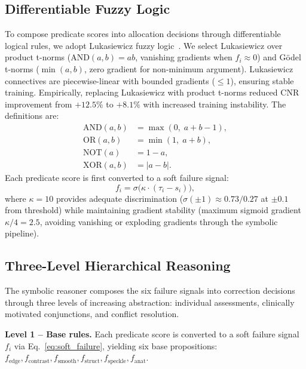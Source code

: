 \documentclass[journal,twoside,web]{ieeecolor}
\begin{document}
\subsection{Differentiable Fuzzy Logic}
\label{sec:fuzzy}
To compose predicate scores into allocation decisions through differentiable logical rules, we adopt Lukasiewicz fuzzy logic~\cite{vankrieken2022analyzing}. We select Lukasiewicz over product t-norms ($\text{AND}(a,b) = ab$, vanishing gradients when $f_i \approx 0$) and G\"{o}del t-norms ($\min(a,b)$, zero gradient for non-minimum argument). Lukasiewicz connectives are piecewise-linear with bounded gradients ($\leq 1$), ensuring stable training. Empirically, replacing Lukasiewicz with product t-norms reduced CNR improvement from $+12.5\%$ to $+8.1\%$ with increased training instability. The definitions are:
\begin{align*}
\text{AND}(a,b) &= \max(0,\; a + b - 1), \\
\text{OR}(a,b) &= \min(1,\; a + b), \\
\text{NOT}(a) &= 1 - a, \\
\text{XOR}(a,b) &= |a - b|.
\end{align*}
Each predicate score is first converted to a soft failure signal:
\begin{equation}
f_i = \sigma\!\big(\kappa \cdot (\tau_i - s_i)\big),
\label{eq:soft_failure}
\end{equation}
where $\kappa = 10$ provides adequate discrimination ($\sigma(\pm 1) \approx 0.73/0.27$ at $\pm 0.1$ from threshold) while maintaining gradient stability (maximum sigmoid gradient $\kappa/4 = 2.5$, avoiding vanishing or exploding gradients through the symbolic pipeline).

\subsection{Three-Level Hierarchical Reasoning}
The symbolic reasoner composes the six failure signals into correction decisions through three levels of increasing abstraction: individual assessments, clinically motivated conjunctions, and conflict resolution.

\textbf{Level 1 -- Base rules.} Each predicate score is converted to a soft failure signal $f_i$ via Eq.~\eqref{eq:soft_failure}, yielding six base propositions: $f_\text{edge}, f_\text{contrast}, f_\text{smooth}, f_\text{struct}, f_\text{speckle}, f_\text{anat}$.
\end{document}
